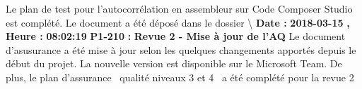 \documentclass{article}%
\begin{document}
%
Le plan de test pour l'autocorrélation en assembleur sur Code Composer Studio est complété. Le document a été déposé dans le dossier \textbackslash{}\newline%
\newline%
%
\textbf{Date : }%
\textbf{2018{-}03{-}15}%
\textbf{,}%
\textbf{ Heure : }%
\textbf{08:02:19}%
\newline%
%
\textbf{P1{-}210 }%
\textbf{ : }%
\textbf{ Revue 2 {-} Mise à jour de l'AQ}%
\newline%
\newline%
%
Le document d'asusurance a été mise à jour selon les quelques changements apportés depuis le début du projet. La nouvelle version est disponible sur le Microsoft Team. De plus, le plan d'assurance~ qualité niveaux 3 et 4~ a été complété pour la revue 2\newline%
~\newline%
\newline%
%
\newpage

%
\end{document}
